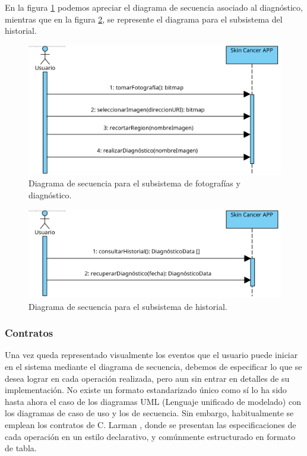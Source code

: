 En la figura \ref{fig:secdiag} podemos apreciar el diagrama de secuencia asociado al diagnóstico, mientras que en la figura \ref{fig:sechistorial}, se represente el diagrama para el subsistema del historial.

\begin{figure}[H]
	\centering
	\includegraphics[scale = 1]{imagenes/DiagramaSecuenciaFotografia.png}
	\caption{Diagrama de secuencia para el subsistema de fotografías y diagnóstico.}
	\label{fig:secdiag}
\end{figure}

\begin{figure}[H]
	\centering
	\includegraphics[scale = 1]{imagenes/DiagramaSecuenciaHistorial.png}
	\caption{Diagrama de secuencia para el subsistema de historial.}
	\label{fig:sechistorial}
\end{figure}

 \subsubsection{Contratos}
 
 Una vez queda representado visualmente los eventos que el usuario puede iniciar en el sistema mediante el diagrama de secuencia, debemos	de especificar lo que se desea lograr en cada operación realizada, pero aun sin entrar en detalles de su implementación. No existe un formato estandarizado único como sí lo ha sido hasta ahora el caso de los diagramas UML (Lenguaje unificado de modelado) con los diagramas de caso de uso y los de secuencia. Sin embargo, habitualmente se emplean los contratos de C. Larman \cite{larman2003uml}, donde se presentan las especificaciones de cada operación en un estilo declarativo, y comúnmente estructurado en formato de tabla.
 
